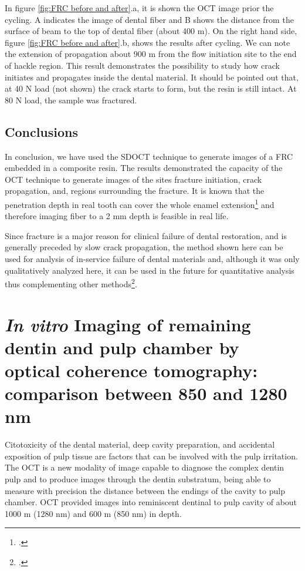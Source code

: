 \documentclass[12pt,twoside,english]{book}
\renewcommand{\~}{\perispomeni}%
\DeclareRobustCommand{\textgreek}[1]{\leavevmode{\greektext #1}}
\numberwithin{equation}{section}
\numberwithin{figure}{section}
\begin{document}
In figure \ref{fig:FRC before and after}.a, it is shown the OCT image prior the cycling. A indicates the image of dental fiber and B shows the distance from the surface of beam to the top of dental fiber (about 400 \textgreek{m}m). On the right hand side, figure \ref{fig:FRC before and after}.b, shows the results after cycling. We can note the extension of propagation about 900 \textgreek{m}m from the flow initiation site to the end of hackle region. This result demonstrates the possibility to study how crack initiates and propagates inside the dental material. It should be pointed out that, at 40 N load (not shown) the crack starts to form, but the resin is still intact. At 80 N load, the sample was fractured.

\subsection{Conclusions}

In conclusion, we have used the SDOCT technique to generate images of a FRC embedded in a composite resin. The results demonstrated the capacity of the OCT technique to generate images of the sites fracture initiation, crack propagation, and, regions surrounding the fracture. It is known that the penetration depth in real tooth can cover the whole enamel extension\footcite{DeMelo:2005p2100} and therefore imaging fiber to a 2 mm depth is feasible in real life. 

Since fracture is a major reason for clinical failure of dental restoration, and is generally preceded by slow crack propagation, the method shown here can be used for analysis of in-service failure of dental materials and, although it was only qualitatively analyzed here, it can be used in the future for quantitative analysis thus complementing other methods\footcite{Loughran:2005p2526}.


\section[Imaging of dentin and pulp chamber by OCT]{\emph{In vitro} Imaging of remaining dentin and pulp chamber by optical coherence tomography: comparison between 850 and 1280 nm}

Citotoxicity of the dental material, deep cavity preparation, and accidental exposition of pulp tissue are factors that can be involved with the pulp irritation. The OCT is a new modality of image capable to diagnose the complex dentin pulp and to produce images through the dentin substratum, being able to measure with precision the distance between the endings of the cavity to pulp chamber. OCT provided images into reminiscent dentinal to pulp cavity of about 1000 \textgreek{m}m (1280 nm) and 600 \textgreek{m}m (850 nm) in depth.
\end{document}
